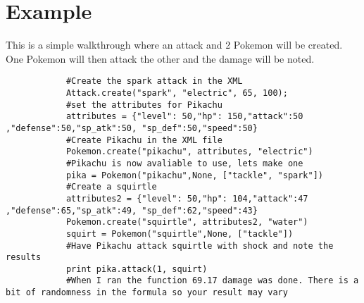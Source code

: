 \documentclass{article}
\begin{document}
        \section{Example}
        This is a simple walkthrough where an attack and 2 Pokemon will be created. One Pokemon will then attack the other and the damage will be noted.
        \begin{lstlisting}
            #Create the spark attack in the XML
            Attack.create("spark", "electric", 65, 100);
            #set the attributes for Pikachu
            attributes = {"level": 50,"hp": 150,"attack":50 ,"defense":50,"sp_atk":50, "sp_def":50,"speed":50}
            #Create Pikachu in the XML file
            Pokemon.create("pikachu", attributes, "electric")
            #Pikachu is now avaliable to use, lets make one
            pika = Pokemon("pikachu",None, ["tackle", "spark"])
            #Create a squirtle
            attributes2 = {"level": 50,"hp": 104,"attack":47 ,"defense":65,"sp_atk":49, "sp_def":62,"speed":43}
            Pokemon.create("squirtle", attributes2, "water")
            squirt = Pokemon("squirtle",None, ["tackle"])
            #Have Pikachu attack squirtle with shock and note the results
            print pika.attack(1, squirt)
            #When I ran the function 69.17 damage was done. There is a bit of randomness in the formula so your result may vary
        \end{lstlisting}
        
\end{document}
